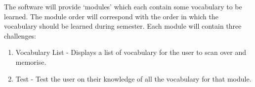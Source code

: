 The software will provide `modules' which each contain some vocabulary to be learned.
The module order will correspond with the order in which the vocabulary should
be learned during semester. Each module will contain three challenges:
\begin{enumerate}
	\item Vocabulary List - Displays a list of vocabulary for the user to scan
		over and memorise.
	\item Test - Test the user on their knowledge of all the vocabulary for
		that module. 
\end{enumerate}
